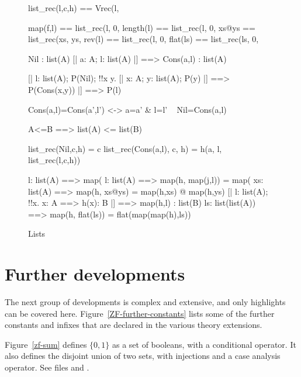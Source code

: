 \begin{figure}\underscoreon %
\begin{ttbox}
    list_rec(l,c,h) == 
                Vrec(l, %

         map(f,l)  == list_rec(l,  0,  %
      length(l) == list_rec(l,  0,  %
         xs@ys     == list_rec(xs, ys, %
         rev(l)    == list_rec(l,  0,  %
        flat(ls)  == list_rec(ls, 0,  %

            Nil : list(A)
           [| a: A;  l: list(A) |] ==> Cons(a,l) : list(A)

    [| l: list(A);
       P(Nil);
       !!x y. [| x: A;  y: list(A);  P(y) |] ==> P(Cons(x,y))
    |] ==> P(l)

        Cons(a,l)=Cons(a',l') <-> a=a' & l=l'
    ~ Nil=Cons(a,l)

       A<=B ==> list(A) <= list(B)

    list_rec(Nil,c,h) = c
   list_rec(Cons(a,l), c, h) = h(a, l, list_rec(l,c,h))

       l: list(A) ==> map(%
     l: list(A) ==> map(h, map(j,l)) = map(%
 xs: list(A) ==> map(h, xs@ys) = map(h,xs) @ map(h,ys)
    [| l: list(A);  !!x. x: A ==> h(x): B |] ==> map(h,l) : list(B)
    ls: list(list(A)) ==> map(h, flat(ls)) = flat(map(map(h),ls))
\end{ttbox}
\caption{Lists} \label{zf-list}
\end{figure}

\section{Further developments}
The next group of developments is complex and extensive, and only
highlights can be covered here.  Figure~\ref{ZF-further-constants} lists
some of the further constants and infixes that are declared in the various
theory extensions.

Figure~\ref{zf-sum} defines $\{0,1\}$ as a set of booleans, with a
conditional operator.  It also defines the disjoint union of two sets, with
injections and a case analysis operator.  See files
 and .

